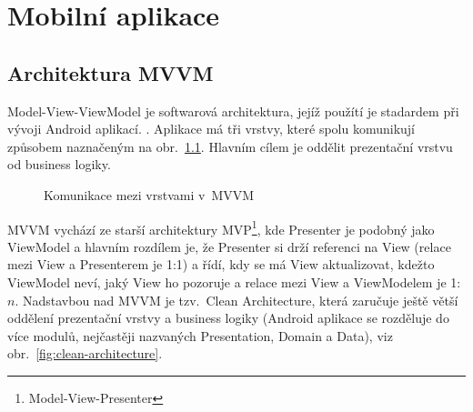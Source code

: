 \documentclass[twoside]{ctuthesis}
\begin{document}

%
\chapter{Mobilní aplikace}
%
\section{Architektura MVVM}

Model-View-ViewModel je softwarová architektura, jejíž použítí je sta\-dar\-dem při vývoji Android aplikací. \cite{android2020guide}. Aplikace má tři vrstvy, které spolu komunikují způsobem naznačeným na obr.~\ref{fig:mvvm}. Hlavním cílem je oddělit prezentační vrstvu od business logiky.  \cite{shekhar2020mvvm}

\begin{figure}[h!]
	
	\caption{Komunikace mezi vrstvami v~MVVM}
	\label{fig:mvvm}
\end{figure}

MVVM vychází ze starší architektury MVP\footnote{Model-View-Presenter}, kde Presenter je podobný jako ViewModel a hlavním rozdílem je, že Presenter si drží referenci na View (relace mezi View a Presenterem je 1:1) a řídí, kdy se má View aktualizovat, kdežto ViewModel neví, jaký View ho pozoruje a relace mezi View a ViewModelem je 1:$n$. \cite{vogel2017android} Nadstavbou nad MVVM je tzv.~Clean Architecture, která zaručuje ještě větší oddělení prezentační vrstvy a business logiky (Android aplikace se rozděluje do více modulů, nejčastěji nazvaných Presentation, Domain a Data), viz obr.~\ref{fig:clean-architecture}. \cite{jain2019kotlin}
\end{document}
